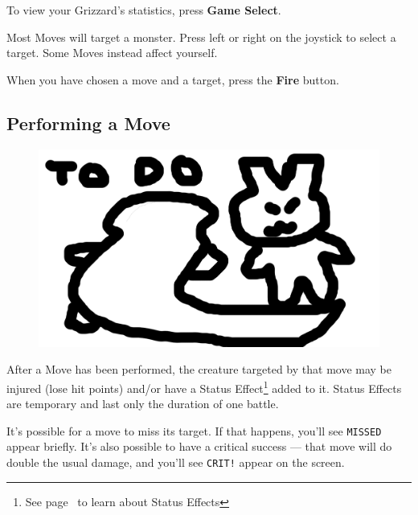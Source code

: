 \documentclass[10pt,twocolumn,openany,article]{memoir}
\begin{document}
To view your Grizzard's statistics, press \textbf{Game Select}.

Most Moves will target a monster. Press left or right on the joystick to
select a target. Some Moves instead affect yourself.

When   you   have   chosen   a    move   and   a   target,   press   the
\textbf{Fire} button.


\subsection{Performing a Move}

\begin{figure}[b]
  \begin{center}
    \includegraphics[width=2\columnwidth,height=\columnwidth]{../Manual/GrizzardCombat.png}
  \end{center}
\end{figure}

After a Move has been performed,  the creature targeted by that move may
be injured  (lose hit points)  and/or have a  Status Effect\footnote{See
  page~\pageref{sec:StatusEffects} to learn  about Status Effects} added
to  it. Status  Effects  are temporary  and last  only  the duration  of
one battle.

It's possible for a move to miss its target. If that happens, you'll see
\texttt{MISSED} appear  briefly. It's also  possible to have  a critical
success ---  that move will do  double the usual damage,  and you'll see
\texttt{CRIT!} appear on the screen.
\end{document}
